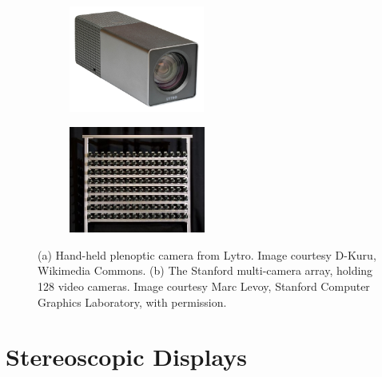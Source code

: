 \begin{figure}[tb]
	\begin{subfigure}[t]{0.45\textwidth}
		\centering
		\includegraphics[height = 3.5cm]{../Figures/lytro/Lytro_Light_Field_Camera-front_background_removed}
		\caption{}
		\label{fig:lytro_camera}
	\end{subfigure}
	\hfill
	\begin{subfigure}[t]{0.45\textwidth}
		\centering
		\includegraphics[height = 3.5cm]{../Figures/camera_array/stanford_camera_array_2}
		\caption{}
		\label{fig:stanford_camera_array}
	\end{subfigure}
	\caption[Light field aquisition devices]
			{(a) Hand-held plenoptic camera from Lytro. 
				 Image courtesy \mbox{D-Kuru}, \mbox{Wikimedia} Commons.
			 (b) The Stanford multi-camera array, holding 128 video cameras.
				 Image courtesy Marc Levoy, Stanford Computer Graphics Laboratory, with permission.}
\end{figure}

\section{Stereoscopic Displays}

